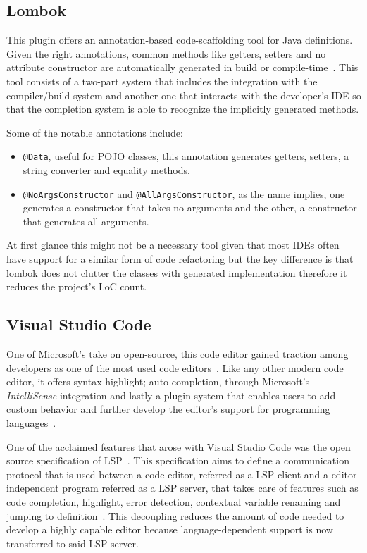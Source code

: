 \subsection{Lombok}\label{tech:lombok}
This plugin offers an annotation-based code-scaffolding tool for Java definitions. Given the right annotations, common methods like getters, setters and no attribute constructor are automatically generated in build or compile-time~\cite{lombok}. This tool consists of a two-part system that includes the integration with the compiler/build-system and another one that interacts with the developer's \gls{IDE} so that the completion system is able to recognize the implicitly generated methods.

Some of the notable annotations include:

\begin{itemize}
\item \texttt{@Data}, useful for \gls{POJO} classes, this annotation generates getters, setters, a string converter and equality methods.
\item \texttt{@NoArgsConstructor} and \texttt{@AllArgsConstructor}, as the name implies, one generates a constructor that takes no arguments and the other, a constructor that generates all arguments.
\end{itemize}

At first glance this might not be a necessary tool given that most \gls{IDE}s often have support for a similar form of code refactoring but the key difference is that lombok does not clutter the classes with generated implementation therefore it reduces the project's \gls{LoC} count.

\subsection{Visual Studio Code}
One of Microsoft's take on open-source, this code editor gained traction among developers as one of the most used code editors~\cite{vscodesurvey}. Like any other modern code editor, it offers syntax highlight; auto-completion, through Microsoft's \textit{IntelliSense} integration and lastly a plugin system that enables users to add custom behavior and further develop the editor's support for programming languages~\cite{vscode}.

One of the acclaimed features that arose with Visual Studio Code was the open source specification of \gls{LSP}~\cite{lsplaunch}. This specification aims to define a communication protocol that is used between a code editor, referred as a \gls{LSP} client and a editor-independent program referred as a \gls{LSP} server, that takes care of features such as code completion, highlight, error detection, contextual variable renaming and jumping to definition~\cite{lspspec}. This decoupling reduces the amount of code needed to develop a highly capable editor because language-dependent support is now transferred to said \gls{LSP} server.


